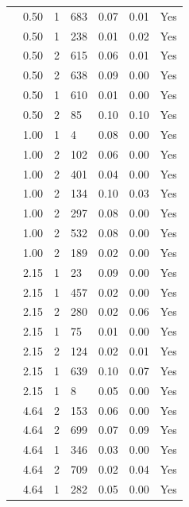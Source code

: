 \begin{longtable}{ | M{2.0cm} | M{2.0cm} | M{1.5cm} | M{1.5cm} | M{2.0cm} | M{2.0cm} | M{1.5cm} | }
                 & 0.50 & 1 & 683 & 0.07 & 0.01 & Yes \\
                 & 0.50 & 1 & 238 & 0.01 & 0.02 & Yes \\
                 & 0.50 & 2 & 615 & 0.06 & 0.01 & Yes \\
                 & 0.50 & 2 & 638 & 0.09 & 0.00 & Yes \\
                 & 0.50 & 1 & 610 & 0.01 & 0.00 & Yes \\
                 & 0.50 & 2 & 85  & 0.10 & 0.10 & Yes \\
                 & 1.00 & 1 & 4   & 0.08 & 0.00 & Yes \\
                 & 1.00 & 2 & 102 & 0.06 & 0.00 & Yes \\
                 & 1.00 & 2 & 401 & 0.04 & 0.00 & Yes \\
                 & 1.00 & 2 & 134 & 0.10 & 0.03 & Yes \\
                 & 1.00 & 2 & 297 & 0.08 & 0.00 & Yes \\
                 & 1.00 & 2 & 532 & 0.08 & 0.00 & Yes \\
                 & 1.00 & 2 & 189 & 0.02 & 0.00 & Yes \\
                 & 2.15 & 1 & 23  & 0.09 & 0.00 & Yes \\
                 & 2.15 & 1 & 457 & 0.02 & 0.00 & Yes \\
                 & 2.15 & 2 & 280 & 0.02 & 0.06 & Yes \\
                 & 2.15 & 1 & 75  & 0.01 & 0.00 & Yes \\
                 & 2.15 & 2 & 124 & 0.02 & 0.01 & Yes \\
                 & 2.15 & 1 & 639 & 0.10 & 0.07 & Yes \\
                 & 2.15 & 1 & 8   & 0.05 & 0.00 & Yes \\
                 & 4.64 & 2 & 153 & 0.06 & 0.00 & Yes \\
                 & 4.64 & 2 & 699 & 0.07 & 0.09 & Yes \\
                 & 4.64 & 1 & 346 & 0.03 & 0.00 & Yes \\
                 & 4.64 & 2 & 709 & 0.02 & 0.04 & Yes \\
                 & 4.64 & 1 & 282 & 0.05 & 0.00 & Yes \\

\end{longtable}
